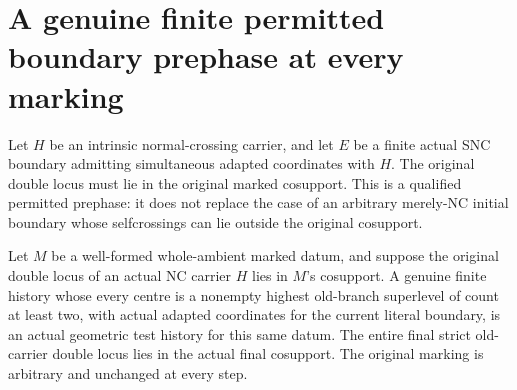 \section{A genuine finite permitted boundary prephase at every marking}
\label{sec:hironaka-normal-crossings-any-mark-prephase}

Let $H$ be an intrinsic normal-crossing carrier, and let $E$ be a
finite actual SNC boundary admitting simultaneous adapted coordinates
with $H$. The original double locus must lie in the original marked
cosupport. This is a qualified permitted prephase: it does not replace
the case of an arbitrary merely-NC initial boundary whose selfcrossings
can lie outside the original cosupport.

\begin{theorem}
\label{hir:general-nc-any-mark-higher-history-test-and-double-cosupport}
Let $M$ be a well-formed whole-ambient marked datum, and suppose the
original double locus of an actual NC carrier $H$ lies in $M$'s
cosupport. A genuine finite history whose every centre is a nonempty
highest old-branch superlevel of count at least two, with actual
adapted coordinates for the current literal boundary, is an actual
geometric test history for this same datum. The entire final strict
old-carrier double locus lies in the actual final cosupport. The
original marking is arbitrary and unchanged at every step.
\leanok
\end{theorem}
